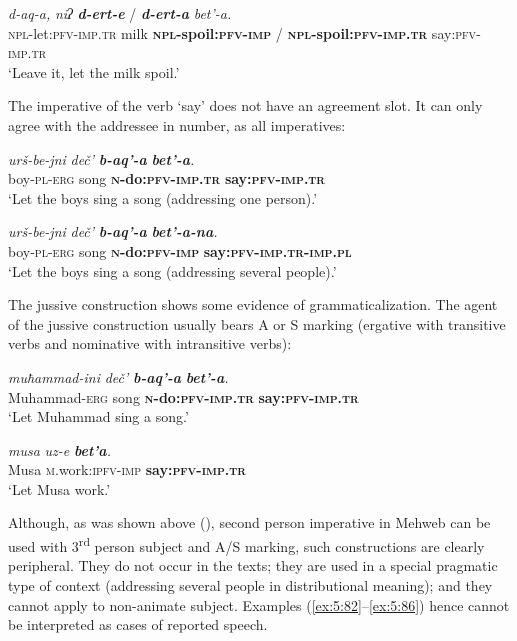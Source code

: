 ﻿\documentclass[output=paper]{langsci/langscibook}
\begin{document}
\ea %
\gll \emph{d-aq-a,} \emph{niʔ} \emph{\textbf{d-ert-e}} / \emph{\textbf{d-ert-a}}  \emph{bet'-a.}\\
 \textsc{npl}-let:\textsc{pfv}-\textsc{imp}.\textsc{tr} milk \textbf{\textsc{npl}-spoil:\textsc{pfv}-\textsc{imp}} / \textbf{\textsc{npl}-spoil:\textsc{pfv}-\textsc{imp}.\textsc{tr}} say:\textsc{pfv}-\textsc{imp}.\textsc{tr}\\
\glt `Leave it, let the milk spoil.'
\z

The imperative of the verb `say' does not have an agreement slot. It can
only agree with the addressee in number, as all imperatives:

\ea %
\gll \emph{urš-be-jni} \emph{deč'} \emph{\textbf{b-aq'-a}} \emph{\textbf{bet'-a}.}\\
 boy-\textsc{pl}-\textsc{erg} song \textbf{\textsc{n}-do:\textsc{pfv}-\textsc{imp}.\textsc{tr}} \textbf{say:\textsc{pfv}-\textsc{imp}.\textsc{tr}}\\
\glt `Let the boys sing a song (addressing one person).'

\ex %
\gll \emph{urš-be-jni} \emph{deč'} \emph{\textbf{b-aq'-a}} \emph{\textbf{bet'-a-na}.}\\
 boy-\textsc{pl}-\textsc{erg} song \textbf{\textsc{n}-do:\textsc{pfv}-\textsc{imp}} \textbf{say:\textsc{pfv}-\textsc{imp}.\textsc{tr}-\textsc{imp}.\textsc{pl}}\\
\glt `Let the boys sing a song (addressing several people).'
\z

The jussive construction shows some evidence of grammaticalization. The
agent of the jussive construction usually bears A or S marking (ergative
with transitive verbs and nominative with intransitive verbs):

\ea \label{ex:5:86} %
\gll \emph{muħammad-ini} \emph{deč'} \emph{\textbf{b-aq'-a}} \emph{\textbf{bet'-a}.}\\
 Muhammad-\textsc{erg} song \textbf{\textsc{n}-do:\textsc{pfv}-\textsc{imp}.\textsc{tr}} \textbf{say:\textsc{pfv}-\textsc{imp}.\textsc{tr}}\\
\glt `Let Muhammad sing a song.'

\ex \label{ex:5:87} %
\gll \emph{musa} \emph{uz-e } \emph{\textbf{bet'a}.}\\
 Musa \textsc{m}.work:\textsc{ipfv}-\textsc{imp} \textbf{say:\textsc{pfv}-\textsc{imp}.\textsc{tr}}\\
\glt `Let Musa work.'
\z

Although, as was shown above (), second person imperative in
Mehweb can be used with 3\textsuperscript{rd} person subject and {A/S}
marking, such constructions are clearly peripheral. They do not occur in
the texts; they are used in a special pragmatic type of context 
(addressing several people in distributional meaning); and they cannot apply
to non-animate subject. Examples (\ref{ex:5:82}–\ref{ex:5:86}) hence cannot be interpreted
as cases of reported speech.
\end{document}
